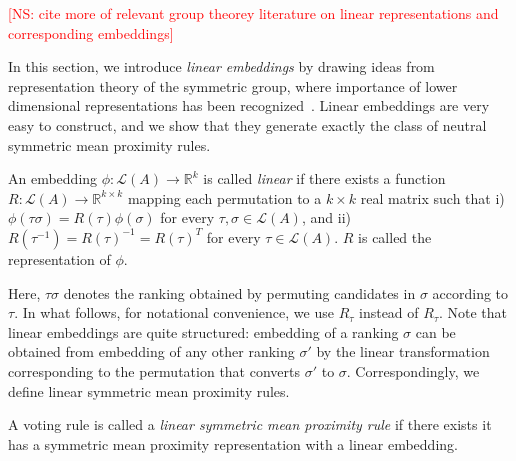 \documentclass[10pt,letterpaper]{article}
\newcommand{\calL}{{\mathcal{L}}}
\newcommand{\rank}{{\calL(A)}}
\newenvironment{definition}[1][Definition]{\begin{trivlist}
\item[\hskip \labelsep {\bfseries #1}]}{\end{trivlist}}
\newcommand{\kibitz}[2]{\ifnum\Comments=1\textcolor{#1}{#2}\fi}
\newcommand{\cns}[1]{\kibitz{red} {[NS: #1]}}
\begin{document}
\cns{cite more of relevant group theorey literature on linear representations and corresponding embeddings}

In this section, we introduce \emph{linear embeddings} by drawing ideas from representation theory of the symmetric group, where importance of lower dimensional representations has been recognized~\cite{Burnside12,KT12}. Linear embeddings are very easy to construct, and we show that they generate exactly the class of neutral symmetric mean proximity rules. 


\begin{definition}[Linear Embeddings]
An embedding $\phi:\rank \rightarrow \mathbb{R}^k$ is called \emph{linear} if there exists a function $R : \rank \rightarrow \mathbb{R}^{k \times k}$ mapping each permutation to a $k \times k$ real matrix such that i) $\phi(\tau \sigma) = R(\tau) \phi(\sigma)$ for every $\tau,\sigma \in \rank$, and ii) $R(\tau^{-1}) = R(\tau)^{-1} = R(\tau)^T$ for every $\tau \in \rank$. $R$ is called the representation of $\phi$. 
\end{definition}

Here, $\tau \sigma$ denotes the ranking obtained by permuting candidates in $\sigma$ according to $\tau$. In what follows, for notational convenience, we use $R_{\tau}$ instead of $R_{\tau}$. Note that linear embeddings are quite structured: embedding of a ranking $\sigma$ can be obtained from embedding of any other ranking $\sigma'$ by the linear transformation corresponding to the permutation that converts $\sigma'$ to $\sigma$. Correspondingly, we define linear symmetric mean proximity rules.

\begin{definition}[Linear Symmetric Mean Proximity Rule]
A voting rule is called a \emph{linear symmetric mean proximity rule} if there exists it has a symmetric mean proximity representation with a linear embedding. 
\end{definition}

\end{document}
